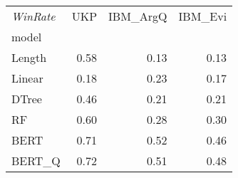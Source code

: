 \begin{tabular}{lrrr}
\toprule
\textit{WinRate} &   UKP &  IBM\_ArgQ &  IBM\_Evi \\
model  &       &           &          \\
\midrule
Length &  0.58 &      0.13 &     0.13 \\
Linear &  0.18 &      0.23 &     0.17 \\
DTree  &  0.46 &      0.21 &     0.21 \\
RF     &  0.60 &      0.28 &     0.30 \\
BERT   &  0.71 &      0.52 &     0.46 \\
BERT\_Q &  0.72 &      0.51 &     0.48 \\
\bottomrule
\end{tabular}
